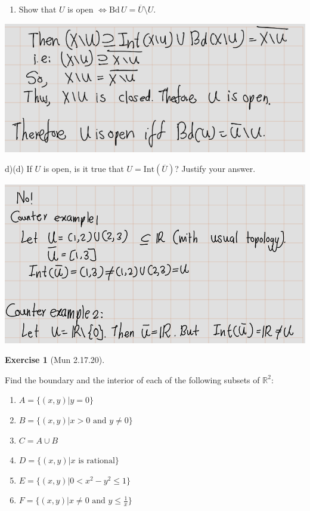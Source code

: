 \documentclass[
]{book}
\providecommand{\tightlist}{%
  \setlength{\itemsep}{0pt}\setlength{\parskip}{0pt}}
\theoremstyle{definition}
\theoremstyle{definition}
\theoremstyle{definition}
\newtheorem{exercise}{Exercise}[chapter]
\theoremstyle{definition}
\theoremstyle{remark}
\begin{document}
\begin{enumerate}
\def\labelenumi{(\alph{enumi})}
\setcounter{enumi}{2}
\tightlist
\item
  Show that \(U\) is open \(\Leftrightarrow \text{Bd} \, U = \overline{U} \setminus U\).
\end{enumerate}

\includegraphics{figures/Exercises/Ex 2.17/ex-19-5.png}

d)(d) If \(U\) is open, is it true that \(U = \text{Int}(\overline{U})\)? Justify your answer.

\includegraphics{figures/Exercises/Ex 2.17/ex-19-6.png}

\begin{exercise}[Mun 2.17.20]
\protect\hypertarget{exr:unnamed-chunk-178}{}\label{exr:unnamed-chunk-178}

Find the boundary and the interior of each of the following subsets of \(\mathbb{R}^2\):

\begin{enumerate}
\def\labelenumi{(\alph{enumi})}
\tightlist
\item
  \(A = \{(x, y) | y = 0\}\)
\item
  \(B = \{(x, y) | x > 0 \text{ and } y \neq 0\}\)
\item
  \(C = A \cup B\)
\item
  \(D = \{(x, y) | x \text{ is rational}\}\)
\item
  \(E = \{(x, y) | 0 < x^2 - y^2 \leq 1\}\)
\item
  \(F = \{(x, y) | x \neq 0 \text{ and } y \leq \frac{1}{x}\}\)
\end{enumerate}

\end{exercise}
\end{document}
